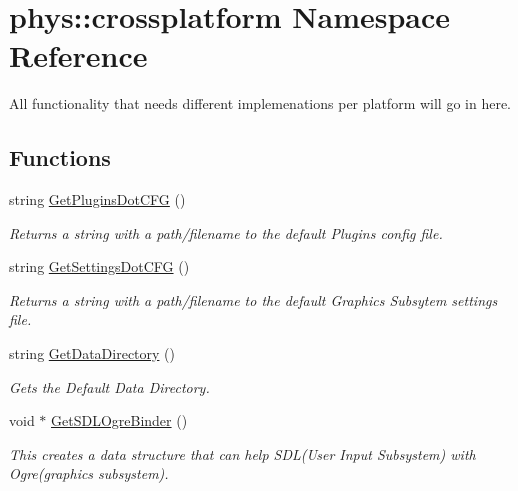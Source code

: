 \hypertarget{namespacephys_1_1crossplatform}{
\section{phys::crossplatform Namespace Reference}
\label{d4/d59/namespacephys_1_1crossplatform}
}


All functionality that needs different implemenations per platform will go in here.  


\subsection*{Functions}
\begin{DoxyCompactItemize}
\item 
string \hyperlink{namespacephys_1_1crossplatform_a8f7321f409f1f2a5fa07881ae22fcc2d}{GetPluginsDotCFG} ()
\begin{DoxyCompactList}\small\item\em Returns a string with a path/filename to the default Plugins config file. \item\end{DoxyCompactList}\item 
string \hyperlink{namespacephys_1_1crossplatform_a2d43f3aa5a485564c3f375b36a08152f}{GetSettingsDotCFG} ()
\begin{DoxyCompactList}\small\item\em Returns a string with a path/filename to the default Graphics Subsytem settings file. \item\end{DoxyCompactList}\item 
string \hyperlink{namespacephys_1_1crossplatform_ac73c7f2db76ddfeb41723d72decc1366}{GetDataDirectory} ()
\begin{DoxyCompactList}\small\item\em Gets the Default Data Directory. \item\end{DoxyCompactList}\item 
void $\ast$ \hyperlink{namespacephys_1_1crossplatform_a596ed780d507e681d9261d26b64a8ed9}{GetSDLOgreBinder} ()
\begin{DoxyCompactList}\small\item\em This creates a data structure that can help SDL(User Input Subsystem) with Ogre(graphics subsystem). \item\end{DoxyCompactList}\item 

\end{DoxyCompactItemize}
